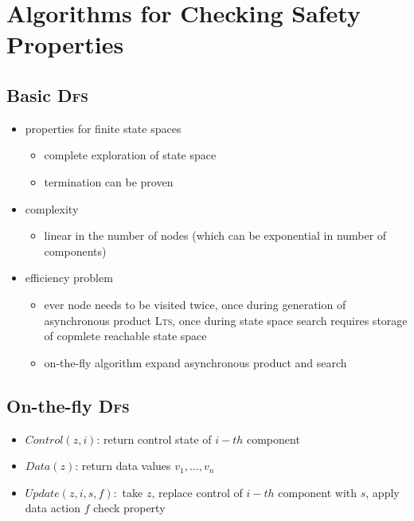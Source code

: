 \documentclass[a4paper, 10pt]{article}
\begin{document}
\section*{Algorithms for Checking Safety Properties}
\subsection*{Basic \textsc{Dfs}}

\begin{itemize}
    \item properties for finite state spaces
    \begin{itemize}
        \item complete exploration of state space
        \item termination can be proven
    \end{itemize}
    \item complexity
    \begin{itemize}
        \item linear in the number of nodes (which can be exponential in number of components)
    \end{itemize}
    \item efficiency problem
    \begin{itemize}
        \item ever node needs to be visited twice, once during generation of asynchronous product \textsc{Lts}, once during state space search \follows requires storage of copmlete {\tiny reachable} state space
        \item on-the-fly algorithm \follows expand asynchronous product and search
    \end{itemize}
\end{itemize}
\subsection*{On-the-fly \textsc{Dfs}}

\begin{itemize}
    \item $Control(z,i)$: return control state of $i-th$ component
    \item $Data(z)$: return data values $v_1,\dots,v_n$
    \item $Update(z,i,s,f):$ take $z$, replace control of $i-th$ component with $s$, apply data action $f$ \follows check property
\end{itemize}
\end{document}
